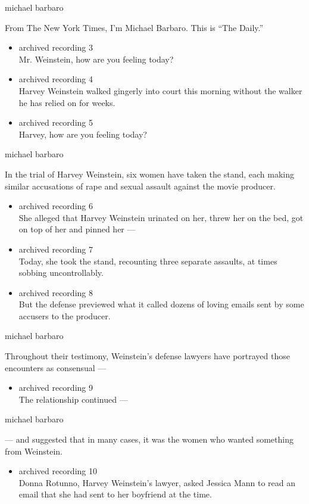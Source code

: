 michael barbaro

From The New York Times, I'm Michael Barbaro. This is ``The Daily.''

\begin{itemize}
\item
  archived recording 3\\
  Mr. Weinstein, how are you feeling today?
\item
  archived recording 4\\
  Harvey Weinstein walked gingerly into court this morning without the
  walker he has relied on for weeks.
\item
  archived recording 5\\
  Harvey, how are you feeling today?
\end{itemize}

michael barbaro

In the trial of Harvey Weinstein, six women have taken the stand, each
making similar accusations of rape and sexual assault against the movie
producer.

\begin{itemize}
\item
  archived recording 6\\
  She alleged that Harvey Weinstein urinated on her, threw her on the
  bed, got on top of her and pinned her ---
\item
  archived recording 7\\
  Today, she took the stand, recounting three separate assaults, at
  times sobbing uncontrollably.
\item
  archived recording 8\\
  But the defense previewed what it called dozens of loving emails sent
  by some accusers to the producer.
\end{itemize}

michael barbaro

Throughout their testimony, Weinstein's defense lawyers have portrayed
those encounters as consensual ---

\begin{itemize}
\tightlist
\item
  archived recording 9\\
  The relationship continued ---
\end{itemize}

michael barbaro

--- and suggested that in many cases, it was the women who wanted
something from Weinstein.

\begin{itemize}
\tightlist
\item
  archived recording 10\\
  Donna Rotunno, Harvey Weinstein's lawyer, asked Jessica Mann to read
  an email that she had sent to her boyfriend at the time.
\end{itemize}

